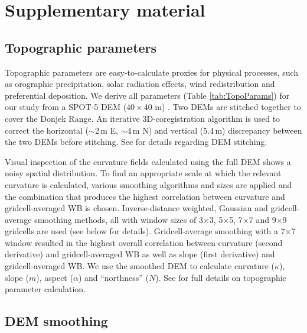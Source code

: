 \documentclass[onecolumn, letterpaper]{igs}
\begin{document}
\title[Estimating winter balance and its uncertainty]{}
\author[Pulwicki and others, 2018]{}
  
\section*{Supplementary material}

\subsection*{Topographic parameters}


Topographic parameters are easy-to-calculate proxies for physical processes, such as orographic precipitation, solar radiation effects, wind redistribution and preferential deposition. We derive all parameters (Table \ref{tab:TopoParams}) for our study from a SPOT-5 DEM ($40\times40$ m) \citep{Korona2009}. Two DEMs are stitched together to cover the Donjek Range. An iterative 3D-coregistration algorithm \citep{Berthier2007} is used to correct the horizontal ($\sim$2\,m E, $\sim$4\,m N) and vertical (5.4\,m) discrepancy between the two DEMs before stitching. See \cite{Pulwicki2017} for details regarding DEM stitching.

Visual inspection of the curvature fields calculated using the full DEM shows a noisy spatial distribution. To find an appropriate scale at which the relevant curvature is calculated, various smoothing algorithms and sizes are applied and the combination that produces the highest correlation between curvature and gridcell-averaged WB is chosen. Inverse-distance weighted, Gaussian and gridcell-average smoothing methods, all with window sizes of 3$\times$3, 5$\times$5, 7$\times$7 and 9$\times$9 gridcells are used (see below for details). Gridcell-average smoothing with a 7$\times$7 window resulted in the highest overall correlation between curvature (second derivative) and gridcell-averaged WB as well as slope (first derivative) and gridcell-averaged WB. We use the smoothed DEM to calculate curvature ($\kappa$), slope ($m$), aspect ($\alpha$) and ``northness'' ($N$). See \cite{Pulwicki2017} for full details on topographic parameter calculation.

\subsection*{DEM smoothing}
\end{document}
